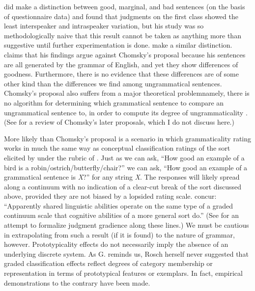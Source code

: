 did make a distinction between good, marginal, and bad sentences (on the basis of questionnaire data) and found that judgments on the first class showed the least interspeaker and intraspeaker variation, but his study was so methodologically naive that this result cannot be taken as anything more than suggestive until further experimentation is done. \citet{QuirkEtAl1966} make a similar distinction. \citet{Watt1975} claims that his findings argue against Chomsky's proposal because his sentences are all generated by the grammar of English, and yet they show differences of goodness. Furthermore, there is no evidence that these differences are of some other kind than the differences we find among ungrammatical sentences. Chomsky's proposal also suffers from a major theoretical problem\schdash{}namely, there is no algorithm for determining which grammatical sentence to compare an ungrammatical sentence to, in order to compute its degree of ungrammaticality \citep{Fillmore1972}. (See \citet{Watt1975} for a review of Chomsky's later proposals, which I do not discuss here.)

More likely than Chomsky's proposal is a scenario in which grammaticality rating works in much the same way as conceptual classification ratings of the sort elicited by \citet{Rosch1975} under the rubric of . Just as we can ask, ``How good an example of a bird is a robin/ostrich/butterfly/chair?''  we can ask, ``How good an example of a grammatical sentence is \textit{X}?'' for any string \textit{X}. The responses will likely spread along a continuum with no indication of a clear-cut break of the sort discussed above, provided they are not biased by a lopsided rating scale. \citet[47]{KessEtAl1983}
concur: ``Apparently shared linguistic abilities operate on the same type of a graded continuum scale that cognitive abilities of a more general sort do.'' (See  for an attempt to formalize judgment gradience along these lines.) We must be cautious in extrapolating from such a result (if it is found) to the nature of grammar, however. Prototypicality effects do not necessarily imply the absence of an underlying discrete system. As
G. \citet{Lakoff1987} reminds us, Rosch herself never suggested that graded classification effects reflect degrees of category membership or representation in terms of prototypical features or exemplars. In fact, empirical demonstrations to the contrary have been made.

